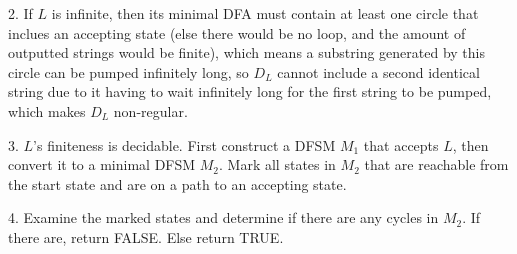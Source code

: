\documentclass{article}
\begin{document}
2. If $L$ is infinite, then its minimal DFA must contain at least one circle that inclues an accepting state (else there would be no loop, and the amount of outputted strings would be finite), which means a substring generated by this circle can be pumped infinitely long, so $D_L$ cannot include a second identical string due to it having to wait infinitely long for the first string to be pumped, which makes $D_L$ non-regular.

3. $L$'s finiteness is decidable. First construct a DFSM $M_1$ that accepts $L$, then convert it to a minimal DFSM $M_2$. Mark all states in $M_2$ that are reachable from the start state and are on a path to an accepting state.

4. Examine the marked states and determine if there are any cycles in $M_2$. If there are, return FALSE. Else return TRUE.
\end{document}

